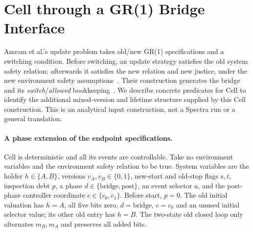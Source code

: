 \section{Cell through a GR(1) Bridge Interface}\label{ta:gr1-cell}
Amram et al.'s update problem takes old/new GR(1) specifications and a switching condition. Before switching, an update strategy satisfies the old system safety relation; afterwards it satisfies the new relation and new justice, under the new environment safety assumptions~\cite[Def.~3.1]{Amram2022GR1DynamicUpdate}. Their construction generates the bridge and its \emph{switch}/\emph{allowed} bookkeeping~\cite[Sec.~4.1]{Amram2022GR1DynamicUpdate}. We describe concrete predicates for Cell to identify the additional mixed-version and lifetime structure supplied by this Cell construction. This is an analytical input construction, not a Spectra run or a general translation.

\paragraph{A phase extension of the endpoint specifications.}
Cell is deterministic and all its events are controllable. Take no environment variables and the environment safety relation to be true. System variables are the holder $h\in\{A,B\}$, versions $v_A,v_B\in\{0,1\}$, new-start and old-stop flags $s,t$, inspection debt $p$, a phase $d\in\{\mathrm{bridge},\mathrm{post}\}$, an event selector $a$, and the post-phase controller coordinate $c\in\{c_0,c_1\}$. Before start, $p=0$. The old initial valuation has $h=A$, all five bits zero, $d=\mathrm{bridge}$, $c=c_0$ and an unused initial selector value; its other old entry has $h=B$. The two-state old closed loop only alternates $m_B,m_A$ and preserves all added bits.

